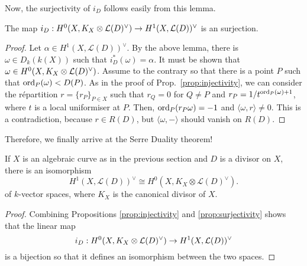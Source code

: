 Now, the surjectivity of $i_{D}$ follows easily from this lemma.
\begin{prop}\label{prop:surjectivity}
  The map $i_{D}:H^0(X,K_X\otimes\mathcal{L}(D)^{\vee})\to H^{1}(X,\mathcal{L}(D))^{\vee}$ is an surjection.
\end{prop}
\begin{proof}
  Let $\alpha\in H^{1}(X,\mathcal{L}(D))^{\vee}$. By the above lemma,
  there is $\omega\in D_{k}(k(X))$ such that $i_{D}^{\ast}(\omega)=\alpha$.
  It must be shown that $\omega\in H^0(X,K_X\otimes\mathcal{L}(D)^{\vee})$. Assume to the contrary so that
  there is a point $P$ such that $\operatorname{ord}_{P}(\omega)<D(P)$. As in the proof
  of Prop.~\ref{prop:injectivity}, we can consider the r\'epartition
  $r=\{r_{P}\}_{P\in X}$ such that $r_{Q}=0$ for $Q\neq P$ and $r_{P}
  =1/t^{\operatorname{ord}_{P}(\omega)+1}$, where $t$ is a local uniformiser at $P$.
  Then, $\operatorname{ord}_{P}(r_{P}\omega)=-1$ and $\langle\omega,r\rangle\neq 0$.
  This is a contradiction, because $r\in R(D)$, but $\langle\omega,-\rangle$
  should vanish on $R(D)$.
\end{proof}

Therefore, we finally arrive at the Serre Duality theorem!
\begin{thm}
  If $X$ is an algebraic curve as in the previous section
  and $D$ is a divisor on $X$, there is an isomorphism
  \[
    H^{1}(X, \mathcal{L}(D))^{\vee}\cong H^{0}(X, K_{X}
    \otimes \mathcal{L}(D)^{\vee}).
  \]
  of $k$-vector spaces, where $K_{X}$ is the canonical divisor of $X$.
\end{thm}
\begin{proof}
  Combining Propositions \ref{prop:injectivity} and \ref{prop:surjectivity}
  shows that the linear map
  \[i_{D}:H^0(X,K_X\otimes\mathcal{L}(D)^{\vee})\to H^{1}(X,\mathcal{L}(D))^{\vee}\]
  is a bijection so that it defines an isomorphism between the two spaces.
\end{proof}
